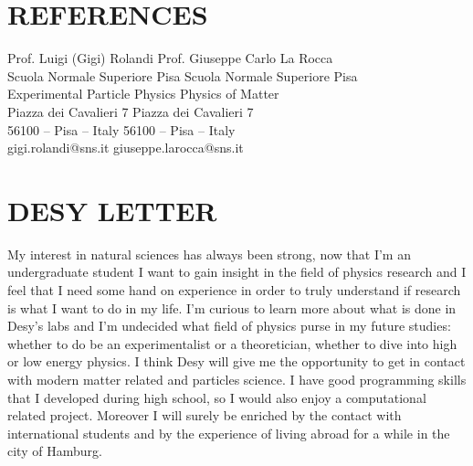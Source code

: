\documentclass[margin, 10pt]{res} %
\begin{document}
\begin{resume}

\section{REFERENCES}

Prof. Luigi (Gigi) Rolandi \hfill Prof. Giuseppe Carlo La Rocca\\
Scuola Normale Superiore Pisa \hfill Scuola Normale Superiore Pisa\\
Experimental Particle Physics \hfill Physics of Matter\\
Piazza dei Cavalieri 7 \hfill Piazza dei Cavalieri 7\\
56100 – Pisa – Italy \hfill 56100 – Pisa – Italy\\
gigi.rolandi@sns.it \hfill giuseppe.larocca@sns.it\\


\section{DESY LETTER}


My interest in natural sciences has always been strong, now that I'm an undergraduate student I want to gain insight in the field of physics research and I feel that
I need some hand on experience in order to truly understand if research is what I want to do in my life. I'm curious to learn more about what is done in Desy's labs and I'm undecided what field of 
physics purse in my future studies: whether to do be an experimentalist or a theoretician, whether to dive into high or low energy physics. I think Desy will give me the opportunity to get in contact with modern matter related and particles science. I have good programming skills that I developed during high school, so I would also enjoy a computational related project.
Moreover I will surely be enriched by the contact with international students and by the experience of living abroad for a while in the city of Hamburg.




\end{resume}
\end{document}
